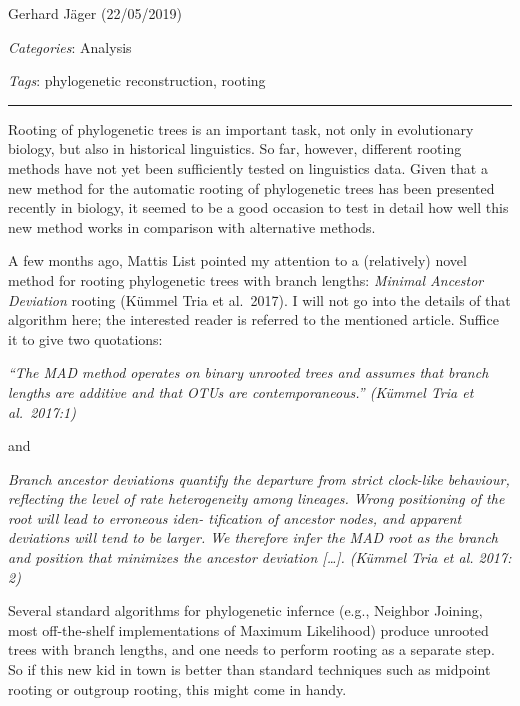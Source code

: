 \documentclass[
  a4paper,
  14pt,
  oneside,
  tablecaptionabove
]{scrbook}
\renewenvironment{quote}{\begin{customblockquote}\list{}{\rightmargin=0em\leftmargin=0em}%
\item\relax\color{blockquote-text}\ignorespaces}{\unskip\unskip\endlist\end{customblockquote}}
\begin{document}
Gerhard Jäger (22/05/2019)

\emph{Categories}: Analysis

\emph{Tags}: phylogenetic reconstruction, rooting

\begin{center}\rule{0.5\linewidth}{1pt}\end{center}

\leavevmode\hypertarget{write}{}%
Rooting of phylogenetic trees is an important task, not only in
evolutionary biology, but also in historical linguistics. So far,
however, different rooting methods have not yet been sufficiently tested
on linguistics data. Given that a new method for the automatic rooting
of phylogenetic trees has been presented recently in biology, it seemed
to be a good occasion to test in detail how well this new method works
in comparison with alternative methods.

{A few months ago, Mattis List pointed my attention to a (relatively)
novel method for rooting phylogenetic trees with branch lengths:
\emph{Minimal Ancestor Deviation} rooting (Kümmel Tria et al.~2017). I
will not go into the details of that algorithm here; the interested
reader is referred to the mentioned article. Suffice it to give two
quotations:}

\begin{quote}
{\emph{\enquote{The MAD method operates on binary unrooted trees and
assumes that branch lengths are additive and that OTUs are
contemporaneous.} (Kümmel Tria et al.~2017:1)}}
\end{quote}

{and}

\begin{quote}
{\emph{Branch ancestor deviations quantify the departure from strict
clock-like behaviour, reflecting the level of rate heterogeneity among
lineages. Wrong positioning of the root will lead to ­erroneous iden-
tification of ancestor nodes, and apparent deviations will tend to be
larger. We therefore infer the MAD root as the branch and position that
minimizes the ancestor deviation {[}\ldots{}{]}. (Kümmel Tria et al.
2017: 2)}}
\end{quote}

{Several standard algorithms for phylogenetic infernce (e.g., Neighbor
Joining, most off-the-shelf implementations of Maximum Likelihood)
produce unrooted trees with branch lengths, and one needs to perform
rooting as a separate step. So if this new kid in town is better than
standard techniques such as midpoint rooting or outgroup rooting, this
might come in handy.}
\end{document}
